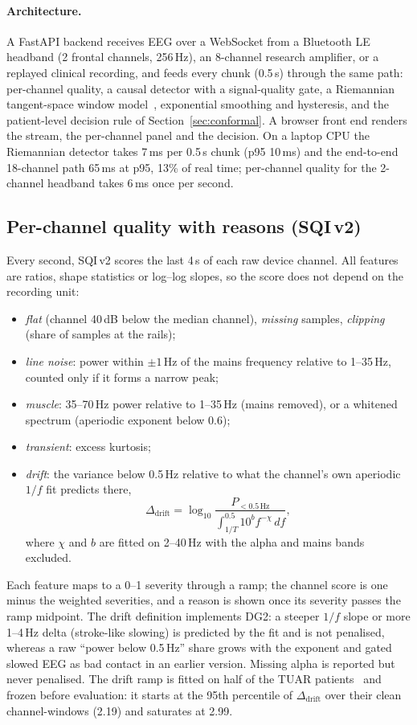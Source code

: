 \documentclass[sigconf,review,anonymous]{acmart}
\newcommand{\sqiv}{SQI\,v2}
\begin{document}
\paragraph{Architecture.}
A FastAPI backend receives EEG over a WebSocket from a Bluetooth LE headband (2 frontal channels, 256\,Hz), an 8-channel research amplifier, or a replayed clinical recording, and feeds every chunk (0.5\,s) through the same path: per-channel quality, a causal detector with a signal-quality gate, a Riemannian tangent-space window model~\cite{barachant2012}, exponential smoothing and hysteresis, and the patient-level decision rule of Section~\ref{sec:conformal}. A browser front end renders the stream, the per-channel panel and the decision.
On a laptop CPU the Riemannian detector takes 7\,ms per 0.5\,s chunk (p95 10\,ms) and the end-to-end 18-channel path 65\,ms at p95, 13\% of real time; per-channel quality for the 2-channel headband takes 6\,ms once per second.

\subsection{Per-channel quality with reasons (\sqiv)}
\label{sec:sqi}
Every second, \sqiv{} scores the last 4\,s of each raw device channel. All features are ratios, shape statistics or log--log slopes, so the score does not depend on the recording unit:
\begin{itemize}
  \item \emph{flat} (channel 40\,dB below the median channel), \emph{missing} samples, \emph{clipping} (share of samples at the rails);
  \item \emph{line noise}: power within $\pm1$\,Hz of the mains frequency relative to 1--35\,Hz, counted only if it forms a narrow peak;
  \item \emph{muscle}: 35--70\,Hz power relative to 1--35\,Hz (mains removed), or a whitened spectrum (aperiodic exponent below 0.6);
  \item \emph{transient}: excess kurtosis;
  \item \emph{drift}: the variance below 0.5\,Hz relative to what the channel's own aperiodic $1/f$ fit predicts there,
  \[\Delta_{\text{drift}} = \log_{10}\frac{P_{<0.5\,\text{Hz}}}{\int_{1/T}^{0.5} 10^{b} f^{-\chi}\,df},\]
  where $\chi$ and $b$ are fitted on 2--40\,Hz with the alpha and mains bands excluded.
\end{itemize}
Each feature maps to a 0--1 severity through a ramp; the channel score is one minus the weighted severities, and a reason is shown once its severity passes the ramp midpoint.
The drift definition implements DG2: a steeper $1/f$ slope or more 1--4\,Hz delta (stroke-like slowing) is predicted by the fit and is not penalised, whereas a raw ``power below 0.5\,Hz'' share grows with the exponent and gated slowed EEG as bad contact in an earlier version.
Missing alpha is reported but never penalised.
The drift ramp is fitted on half of the TUAR patients~\cite{hamid2020tuar} and frozen before evaluation: it starts at the 95th percentile of $\Delta_{\text{drift}}$ over their clean channel-windows (2.19) and saturates at 2.99.
\end{document}
